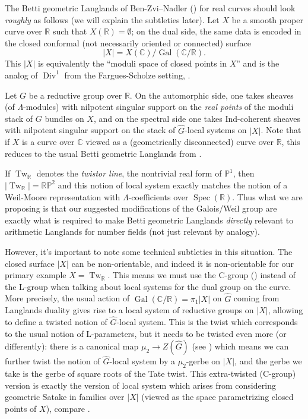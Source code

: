 \documentclass[12pt]{article}
\theoremstyle{definition}
\newcommand{\on}{\operatorname}
\newcommand{\mbb}{\mathbb}
\newcommand{\wh}{\widehat}
\begin{document}
\begin{enumerate}
The Betti geometric Langlands of Ben-Zvi--Nadler (\cite{bznbetti}) for real curves should look \emph{roughly} as follows (we will explain the subtleties later).  Let $X$ be a smooth proper curve over $\mbb{R}$ such that $X(\mbb{R})=\emptyset$; on the dual side, the same data is encoded in the closed conformal (not necessarily oriented or connected) surface
$$|X| = X(\mbb{C})/\on{Gal}(\mbb{C}/\mbb{R}).$$
This $|X|$ is equivalently the ``moduli space of closed points in $X$'' and is the analog of $\on{Div}^1$ from the Fargues-Scholze setting, \cite{farguesscholze}.

Let $G$ be a reductive group over $\mbb{R}$.  On the automorphic side, one takes sheaves (of $\Lambda$-modules) with nilpotent singular support on the \emph{real points} of the moduli stack of $G$ bundles on $X$, and on the spectral side one takes Ind-coherent sheaves with nilpotent singular support on the stack of $\wh{G}$-local systems on $|X|$.
Note that if $X$ is a curve over $\mbb{C}$ viewed as a (geometrically disconnected) curve over $\mbb{R}$, this reduces to the usual Betti geometric Langlands from \cite{bznbetti}.

If $\on{Tw}_{\mbb{R}}$ denotes the \emph{twistor line}, the nontrivial real form of $\mbb{P}^1$, then $|\on{Tw}_{\mbb{R}}|=\mbb{R}\mbb{P}^2$ and this notion of local system exactly matches the notion of a Weil-Moore representation with $\Lambda$-coefficients over $\on{Spec}(\mbb{R})$.  Thus what we are proposing is that our suggested modifications of the Galois/Weil group are exactly what is required to make Betti geometric Langlands \emph{directly} relevant to arithmetic Langlands for number fields (not just relevant by analogy).

However, it's important to note some technical subtleties in this situation.  The closed surface $|X|$ can be non-orientable, and indeed it is non-orientable for our primary example $X=\on{Tw}_{\mbb{R}}$.  This means we must use the C-group (\cite{buzzardgee}) instead of the L-group when talking about local systems for the dual group on the curve.  More precisely, the usual action of $\on{Gal}(\mbb{C}/\mbb{R})=\pi_1|X|$ on $\wh{G}$ coming from Langlands duality gives rise to a local system of reductive groups on $|X|$, allowing to define a twisted notion of $\wh{G}$-local system.  This is the twist which corresponds to the usual notion of L-parameters, but it needs to be twisted even more (or differently): there is a canonical map $\mu_2 \to Z(\wh{G})$ (see \cite{bernsteinsign}) which means we can further twist the notion of $\wh{G}$-local system by a $\mu_2$-gerbe on $|X|$, and the gerbe we take is the gerbe of square roots of the Tate twist. This extra-twisted (C-group) version is exactly the version of local system which arises from considering geometric Satake in families over $|X|$ (viewed as the space parametrizing closed points of $X$), compare \cite{farguesscholze}.
 

\end{enumerate}
\end{document}
